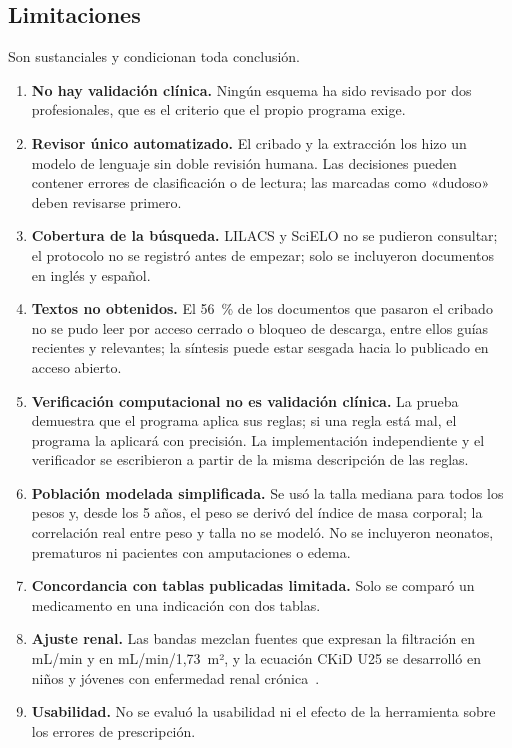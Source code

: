 \documentclass[11pt,a4paper]{article}
\begin{document}
\subsection{Limitaciones}

Son sustanciales y condicionan toda conclusión.

\begin{enumerate}
  \item \textbf{No hay validación clínica.} Ningún esquema ha sido revisado por dos profesionales, que es el criterio que el propio programa exige.
  \item \textbf{Revisor único automatizado.} El cribado y la extracción los hizo un modelo de lenguaje sin doble revisión humana. Las decisiones pueden contener errores de clasificación o de lectura; las marcadas como «dudoso» deben revisarse primero.
  \item \textbf{Cobertura de la búsqueda.} LILACS y SciELO no se pudieron consultar; el protocolo no se registró antes de empezar; solo se incluyeron documentos en inglés y español.
  \item \textbf{Textos no obtenidos.} El 56~\% de los documentos que pasaron el cribado no se pudo leer por acceso cerrado o bloqueo de descarga, entre ellos guías recientes y relevantes; la síntesis puede estar sesgada hacia lo publicado en acceso abierto.
  \item \textbf{Verificación computacional no es validación clínica.} La prueba demuestra que el programa aplica sus reglas; si una regla está mal, el programa la aplicará con precisión. La implementación independiente y el verificador se escribieron a partir de la misma descripción de las reglas.
  \item \textbf{Población modelada simplificada.} Se usó la talla mediana para todos los pesos y, desde los 5 años, el peso se derivó del índice de masa corporal; la correlación real entre peso y talla no se modeló. No se incluyeron neonatos, prematuros ni pacientes con amputaciones o edema.
  \item \textbf{Concordancia con tablas publicadas limitada.} Solo se comparó un medicamento en una indicación con dos tablas.
  \item \textbf{Ajuste renal.} Las bandas mezclan fuentes que expresan la filtración en mL/min y en mL/min/1,73~m², y la ecuación CKiD U25 se desarrolló en niños y jóvenes con enfermedad renal crónica~\citep{pierce2021}.
  \item \textbf{Usabilidad.} No se evaluó la usabilidad ni el efecto de la herramienta sobre los errores de prescripción.
\end{enumerate}
\end{document}
